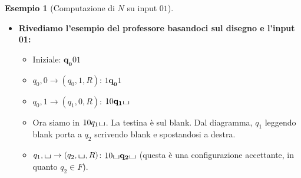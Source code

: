 \documentclass[a4paper]{article}
\theoremstyle{definition} %
\newtheorem{example}{Esempio}
\newcommand{\blankS}{\ensuremath{\raisebox{-0.15ex}{\scalebox{1.3}[0.7]{$\sqcup$}}}}
\begin{document}
\begin{example}[Computazione di $N$ su input $01$]
\begin{enumerate}
    \begin{itemize}
        \item \textbf{Rivediamo l'esempio del professore basandoci sul disegno e l'input 01:}
        \begin{itemize}
            \item Iniziale: $\mathbf{q_0}01$
            \item $q_0,0 \to (q_0,1,R)$: $1\mathbf{q_0}1$
            \item $q_0,1 \to (q_1,0,R)$: $10\mathbf{q_1}\blankS$
            \item Ora siamo in $10q_1\blankS$. La testina è sul blank. Dal diagramma, $q_1$ leggendo blank porta a $q_2$ scrivendo blank e spostandosi a destra.
            \item $q_1,\blankS \to (q_2,\blankS,R)$: $10\blankS\mathbf{q_2}\blankS$ (questa è una configurazione accettante, in quanto $q_2 \in F$).
        \end{itemize}
        

\end{itemize}
\end{enumerate}
\end{example}
\end{document}
